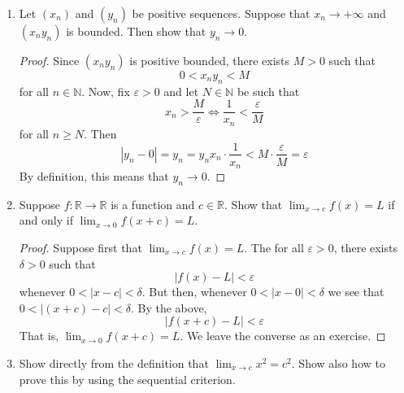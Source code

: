 \documentclass[12pt, reqno]{article}
\numberwithin{equation}{section}
\theoremstyle{definition}
\theoremstyle{remark}
\newcommand{\NN}{\mathbb{N}}
\newcommand{\RR}{\mathbb{R}}
\newcommand{\abs}[1]{\left\lvert#1\right\rvert}
\renewcommand{\epsilon}{\varepsilon}
\begin{document}
\begin{enumerate}[leftmargin=*]
\begin{proof}
		      Conversely, suppose that $1/x_n \to 0$ and let $a\in \RR$ be given. If $a\leq 0$, then $x_n \geq 0 > a$ for all $n \geq 1$. Otherwise, we may pick $N\in \NN$ such that
		      \[
			      \frac{1}{x_n} = \abs{\frac{1}{x_n} - 0} < \frac{1}{a}
		      \]
		      for all $n\geq N$. It follows that
		      \[
			      x_n > a
		      \]
		      for all $n\geq N$. Since the choice of $a\in \RR$ was arbitrary, we see that $x_n \to +\infty$.
	      \end{proof}

	\item Let $(x_n)$ and $(y_n)$ be positive sequences. Suppose that $x_n \to +\infty$ and $(x_ny_n)$ is bounded. Then show that $y_n \to 0$.

	      \begin{proof}
		      Since $(x_ny_n)$ is positive bounded, there exists $M>0$ such that
		      \[
			      0 < x_ny_n < M
		      \]
		      for all $n\in \NN$. Now, fix $\epsilon > 0$ and let $N\in \NN$ be such that
		      \[
			      x_n > \frac{M}{\epsilon}\iff \frac{1}{x_n} < \frac{\epsilon}{M}
		      \]
		      for all $n\geq N$. Then
		      \[
			      \abs{y_n - 0} = y_n = y_n x_n\cdot\frac{1}{x_n} < M\cdot\frac{\epsilon}{M} = \epsilon
		      \]
		      By definition, this means that $y_n \to 0$.
	      \end{proof}

	\item Suppose $f:\RR\to\RR$ is a function and $c\in \RR$. Show that $\lim_{x\to c}f(x) = L$ if and only if $\lim_{x\to 0} f(x+c) = L$.

	      \begin{proof}
		      Suppose first that $\lim_{x\to c}f(x) = L$. The for all $\epsilon > 0$, there exists $\delta>0$ such that
		      \[
			      \abs{f(x) - L} < \epsilon
		      \]
		      whenever $0<\abs{x-c} < \delta$. But then, whenever $0<\abs{x-0} < \delta$ we see that $0<\abs{(x+c) - c} < \delta$. By the above,
		      \[
			      \abs{f(x+c) - L} <\epsilon
		      \]
		      That is, $\lim_{x\to 0} f(x+c) = L$. We leave the converse as an exercise.
	      \end{proof}

	\item Show directly from the definition that $\lim_{x\to c}x^2 = c^2$. Show also how to prove this by using the sequential criterion.


\end{enumerate}
\end{document}
